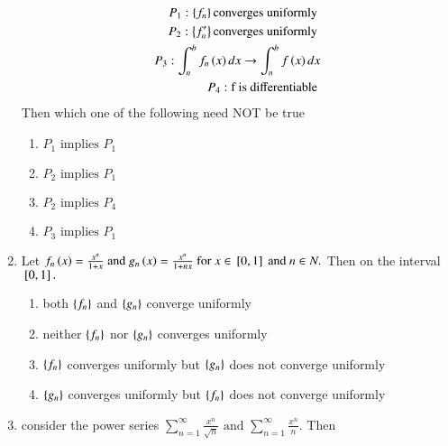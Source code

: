\documentclass[journal]{IEEEtran}
\begin{document}
\begin{enumerate}[start=40]
\begin{align*}
    P_{1}:\left\{f_{n}\right\} \text{converges uniformly }\\
     P_{2}:\left\{f_{n}^{\prime}\right\} \text{converges uniformly }\\
    P_{3}: \int_{n}^{b} f_{n}\left(x\right)dx \to \int_{n}^{b} f\left(x\right)dx\\
    P_{4}:\text{f is differentiable }
\end{align*}
Then which one of the following need NOT be true
\begin{multicols}{4}
    \begin{enumerate}
        \item $P_{1} \text{ implies } P_{1}$
        \item $P_{2} \text{ implies } P_{1}$
        \item $P_{2} \text{ implies } P_{4}$
        \item $P_{3} \text{ implies } P_{1}$
    \end{enumerate}
\end{multicols}
\bigskip
\item Let $f_n\left(x\right)=\frac{x^{n}}{1+x} \text{ and } g_{n}\left(x\right)=\frac{x^{n}}{1+nx} \text{ for } x\in {}\left[0,1\right] \text{ and } n\in N.$ Then on the interval ${}\left[0,1\right].$

    \begin{enumerate}
        \item both $\left\{f_{n}\right\}$ and $\left\{g_{n}\right\}$ converge uniformly
        \item  neither  $\left\{f_{n}\right\}$  nor $\left\{g_{n}\right\}$ converges uniformly
        \item $\left\{f_{n}\right\}$ converges uniformly but $\left\{g_{n}\right\}$ does not converge uniformly
        \item $\left\{g_{n}\right\}$ converges uniformly but $\left\{f_{n}\right\}$ does not converge uniformly
    \end{enumerate}
\bigskip
\item consider the power series $\sum_{n=1}^{\infty}\frac{x^{n}}{\sqrt{n}} \text{ and } \sum_{n=1}^{\infty}\frac{x^{n}}{n} .$ Then 


\end{enumerate}
\end{document}
